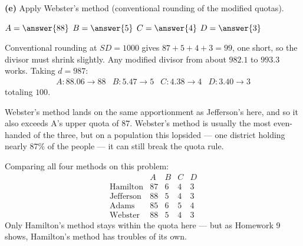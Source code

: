 \documentclass[12pt]{ximera}
\begin{document}
\begin{problem}
\begin{prompt}
\textbf{(e)} Apply Webster's method (conventional rounding of the modified quotas).

$A = \answer{88}$ \quad $B = \answer{5}$ \quad $C = \answer{4}$ \quad $D = \answer{3}$

\begin{feedback}
Conventional rounding at $SD = 1000$ gives $87+5+4+3 = 99$, one short, so the divisor
must shrink slightly. Any modified divisor from about $982.1$ to $993.3$ works. Taking
$d = 987$:
\[
\begin{array}{llll}
A: 88.06 \to 88 & B: 5.47 \to 5 & C: 4.38 \to 4 & D: 3.40 \to 3
\end{array}
\]
totaling $100$. \checkmark

Webster's method lands on the same apportionment as Jefferson's here, and so it also
exceeds A's upper quota of $87$. Webster's method is usually the most even-handed of
the three, but on a population this lopsided --- one district holding nearly $87\%$ of
the people --- it can still break the quota rule.

Comparing all four methods on this problem:
\[
\begin{array}{lcccc}
 & A & B & C & D\\
\text{Hamilton} & 87 & 6 & 4 & 3\\
\text{Jefferson} & 88 & 5 & 4 & 3\\
\text{Adams} & 85 & 6 & 5 & 4\\
\text{Webster} & 88 & 5 & 4 & 3
\end{array}
\]
Only Hamilton's method stays within the quota here --- but as Homework 9 shows,
Hamilton's method has troubles of its own.
\end{feedback}
\end{prompt}
\end{problem}
\end{document}
